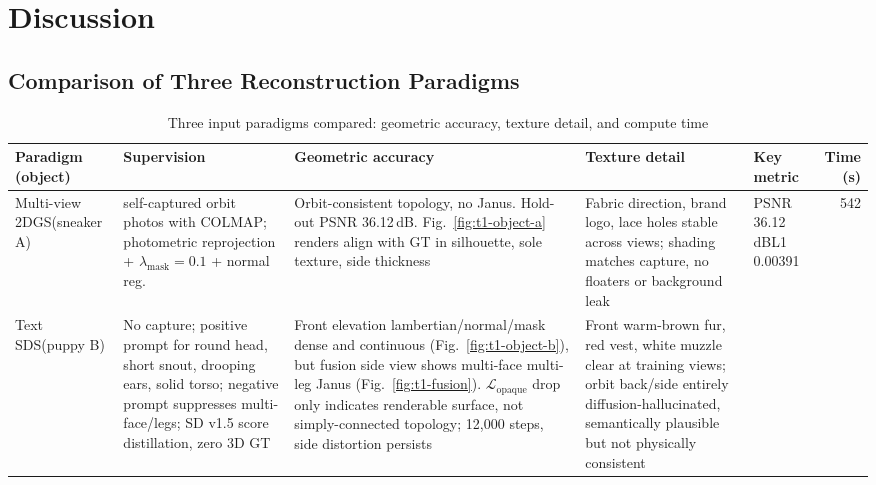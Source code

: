 \documentclass[10pt,twocolumn,letterpaper]{article}
\begin{document}
\section{Discussion}
\label{sec:t1-discuss}

\subsection{Comparison of Three Reconstruction Paradigms}

\begin{table}[!t]
  \centering
  \caption{Three input paradigms compared: geometric accuracy, texture detail, and compute time}
  \label{tab:t1-three-way}
  \footnotesize
  \setlength{\tabcolsep}{4pt}
  \begin{tabular}{@{}>{\raggedright\arraybackslash}p{}>{\raggedright\arraybackslash}p{}>{\raggedright\arraybackslash}p{}>{\raggedright\arraybackslash}p{}>{\raggedright\arraybackslash}p{}r@{}}
    \toprule
    Paradigm (object) & Supervision & Geometric accuracy & Texture detail & Key metric & Time (s) \\
    \midrule
    Multi-view 2DGS\newline (sneaker A) &
    36 self-captured orbit photos with COLMAP; photometric reprojection + $\lambda_{\mathrm{mask}}{=}0.1$ + normal reg. &
    Orbit-consistent topology, no Janus. Hold-out PSNR 36.12\,dB. Fig.~\ref{fig:t1-object-a} renders align with GT in silhouette, sole texture, side thickness &
    Fabric direction, brand logo, lace holes stable across views; shading matches capture, no floaters or background leak &
    PSNR 36.12\,dB\newline L1 0.00391 &
    542 \\
    \addlinespace[2pt]
    Text SDS\newline (puppy B) &
    No capture; positive prompt for round head, short snout, drooping ears, solid torso; negative prompt suppresses multi-face/legs; SD v1.5 score distillation, zero 3D GT &
    Front elevation lambertian/normal/mask dense and continuous (Fig.~\ref{fig:t1-object-b}), but fusion side view shows multi-face multi-leg Janus (Fig.~\ref{fig:t1-fusion}). $\mathcal{L}_{\mathrm{opaque}}$ drop only indicates renderable surface, not simply-connected topology; 12{,}000 steps, side distortion persists &
    Front warm-brown fur, red vest, white muzzle clear at training views; orbit back/side entirely diffusion-hallucinated, semantically plausible but not physically consistent &

\end{tabular}
\end{table}
\end{document}
